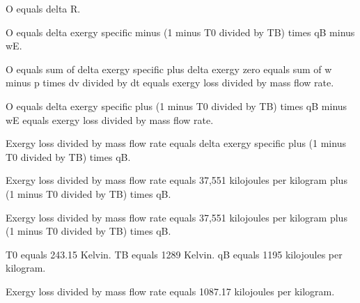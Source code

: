 O equals delta R.  

O equals delta exergy specific minus (1 minus T0 divided by TB) times qB minus wE.  

O equals sum of delta exergy specific plus delta exergy zero equals sum of w minus p times dv divided by dt equals exergy loss divided by mass flow rate.  

O equals delta exergy specific plus (1 minus T0 divided by TB) times qB minus wE equals exergy loss divided by mass flow rate.  

Exergy loss divided by mass flow rate equals delta exergy specific plus (1 minus T0 divided by TB) times qB.  

Exergy loss divided by mass flow rate equals 37,551 kilojoules per kilogram plus (1 minus T0 divided by TB) times qB.  

Exergy loss divided by mass flow rate equals 37,551 kilojoules per kilogram plus (1 minus T0 divided by TB) times qB.  

T0 equals 243.15 Kelvin.  
TB equals 1289 Kelvin.  
qB equals 1195 kilojoules per kilogram.  

Exergy loss divided by mass flow rate equals 1087.17 kilojoules per kilogram.